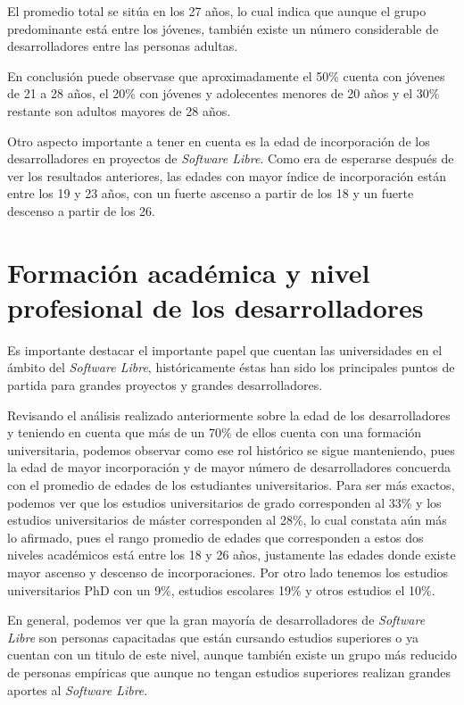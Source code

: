 El promedio total se sitúa en los 27 años, lo cual indica que aunque el grupo predominante está entre los jóvenes, también existe un número considerable de desarrolladores entre las personas adultas. 

En conclusión puede observase que aproximadamente el 50\% cuenta con jóvenes de 21 a 28 años, el 20\% con jóvenes y adolecentes menores de 20 años y el 30\% restante son adultos mayores de 28 años.

Otro aspecto importante a tener en cuenta es la edad de incorporación de los desarrolladores en proyectos de \textit{Software Libre}. Como era de esperarse después de ver los resultados anteriores, las edades con mayor índice de incorporación están entre los 19 y 23 años, con un fuerte  ascenso a partir de  los 18 y un fuerte descenso a partir de los 26.

\section{Formación académica y nivel profesional de los desarrolladores}

Es importante destacar el importante papel que cuentan las universidades en el ámbito del \textit{Software Libre}, históricamente éstas han sido los principales puntos de partida para grandes proyectos y grandes desarrolladores. 

Revisando el análisis realizado anteriormente sobre la edad de los desarrolladores y teniendo en cuenta que más de un 70\% de ellos cuenta con una formación universitaria, podemos observar como ese rol histórico se sigue manteniendo, pues la edad de mayor incorporación y de mayor número de desarrolladores concuerda con el promedio de edades de los estudiantes universitarios.  Para ser más exactos, podemos ver que los estudios universitarios de grado corresponden al 33\% y los estudios universitarios de máster corresponden al 28\%, lo cual constata aún más lo afirmado, pues el rango promedio de edades que corresponden a estos dos niveles académicos está entre los 18 y 26 años, justamente las edades donde existe mayor ascenso y descenso de incorporaciones. Por otro lado tenemos los estudios universitarios PhD con un 9\%, estudios escolares 19\% y otros estudios el 10\%. 

En general, podemos ver que la gran mayoría de desarrolladores de \textit{Software Libre} son personas capacitadas que están cursando estudios superiores o ya cuentan con un titulo de este nivel, aunque también existe un grupo más reducido de personas empíricas que aunque no tengan estudios superiores realizan grandes aportes al \textit{Software Libre}.

